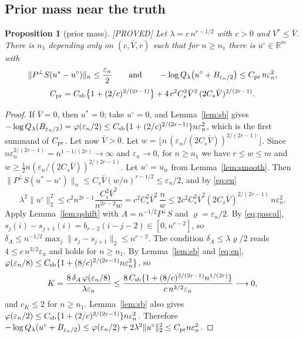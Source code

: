 \documentclass[11pt]{article}
\newtheorem{proposition}{Proposition}
\theoremstyle{definition}
\theoremstyle{remark}
\newcommand{\R}{\mathbb{R}}
\newcommand{\en}{\varepsilon_n}
\newcommand{\Ql}{Q_\lambda}
\newcommand{\Pp}{P^{\perp}}
\newcommand{\Vb}{\bar V}
\newcommand{\nn}[1]{\|#1\|_n}
\newcommand{\proved}{\textup{[PROVED]}}
\begin{document}
\subsection{Prior mass near the truth}

\begin{proposition}[prior mass]\label{prop:prior}\proved{}
Let $\lambda=c\,n^{r-1/2}$ with $c>0$ and $V^{*}\le\Vb$. There is $n_1$ depending only on $(c,\Vb,r)$ such that for $n\ge n_1$ there is $u^\circ\in\R^m$ with
\[
\nn{\Pp S(u^{*}-u^\circ)}\le\frac{\en}2\qquad\text{and}\qquad-\log\Ql\bigl(u^\circ+B_{\en/2}\bigr)\le C_{\rm pr}\,n\en^2,
\]
\[
C_{\rm pr}=C_{\rm sb}\bigl\{1+(2/c)^{2/(2r-1)}\bigr\}+4\,c^2C_s^2\Vb^2\,(2C_s\Vb)^{2/(2r-1)} .
\]
\end{proposition}

\begin{proof}
If $\Vb=0$, then $u^{*}=0$; take $u^\circ=0$, and Lemma~\ref{lem:sb} gives $-\log\Ql(B_{\en/2})=\varphi(\en/2)\le C_{\rm sb}\{1+(2/c)^{2/(2r-1)}\}n\en^2$, which is the first summand of $C_{\rm pr}$. Let now $\Vb>0$.
Let $w=\lfloor n\,(\en/(2C_s\Vb))^{2/(2r-1)}\rfloor$. Since $n\en^{2/(2r-1)}=n^{1-1/(2r)}\to\infty$ and $\en\to0$, for $n\ge n_1$ we have $r\le w\le m$ and $w\ge\tfrac12n(\en/(2C_s\Vb))^{2/(2r-1)}$. Let $u^\circ=u_w$ from Lemma~\ref{lem:smooth}. Then $\nn{\Pp S(u^{*}-u^\circ)}\le C_s\Vb(w/n)^{r-1/2}\le\en/2$, and by \eqref{eq:en}
\begin{equation}\label{eq:shiftcost}
\lambda^2\|u^\circ\|_2^2\le c^2n^{2r-1}\frac{C_s^2\Vb^2}{n^{2r-2}w}=c^2C_s^2\Vb^2\,\frac nw\le2c^2C_s^2\Vb^2(2C_s\Vb)^{2/(2r-1)}\,n\en^2 .
\end{equation}
Apply Lemma~\ref{lem:qshift} with $A=n^{-1/2}\Pp S$ and $\varrho=\en/2$. By \eqref{eq:pascal}, $s_j(i)-s_{j+1}(i)=b_{r-2}(i-j-2)\in[0,n^{r-2}]$, so $\delta_A\le n^{-1/2}\max_j\|s_j-s_{j+1}\|_2\le n^{r-2}$. The condition $\delta_A\le\lambda\varrho/2$ reads $4\le c\,n^{3/2}\en$ and holds for $n\ge n_1$. By Lemma~\ref{lem:sb} and \eqref{eq:en}, $\varphi(\en/8)\le C_{\rm sb}\{1+(8/c)^{2/(2r-1)}n\en^2\}$, so
\[
K=\frac{8\,\delta_A\,\varphi(\en/8)}{\lambda\en}\le\frac{8\,C_{\rm sb}\{1+(8/c)^{2/(2r-1)}n^{1/(2r)}\}}{c\,n^{3/2}\en}\longrightarrow0,
\]
and $c_K\le2$ for $n\ge n_1$. Lemma~\ref{lem:sb} also gives $\varphi(\en/2)\le C_{\rm sb}\{1+(2/c)^{2/(2r-1)}\}n\en^2$. Therefore $-\log\Ql(u^\circ+B_{\en/2})\le\varphi(\en/2)+2\lambda^2\|u^\circ\|_2^2\le C_{\rm pr}n\en^2$.
\end{proof}
\end{document}
